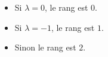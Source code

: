 \begin{itemize}
 \item Si $\lambda=0$, le rang est $0$.
 \item Si $\lambda=-1$, le rang est $1$.
 \item Sinon le rang est $2$.
\end{itemize}
